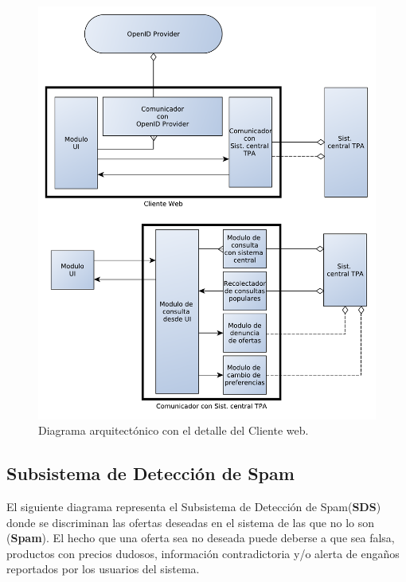 \begin{figure}[H]
	\centering
	\includegraphics[width=\textwidth]{graficos/arch/Cliente_web.pdf}
	\caption{Diagrama arquitectónico con el detalle del \textsf{Cliente web}.}
\end{figure}


\subsection{Subsistema de Detección de Spam}

El siguiente diagrama representa el Subsistema de Detección de Spam(\textbf{SDS}) donde se discriminan las ofertas deseadas en el sistema de las que no lo son (\textbf{Spam}). El hecho que una oferta sea no deseada puede deberse a que sea falsa, productos con precios dudosos, información contradictoria y/o alerta de enga\~{n}os reportados por los usuarios del sistema.

